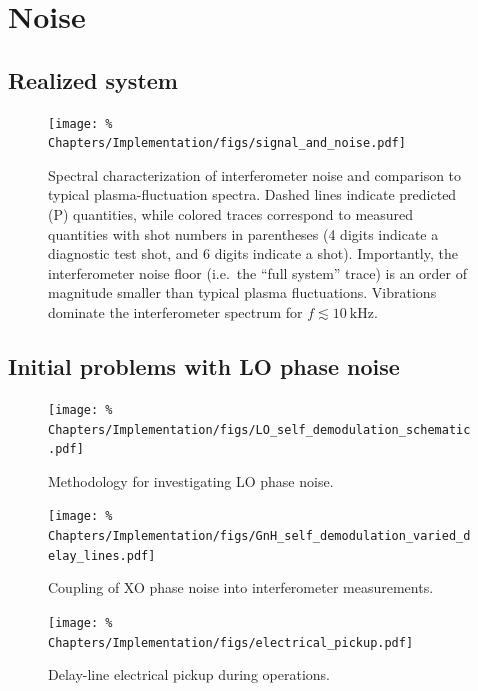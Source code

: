 \section{Noise}


\subsection{Realized system}
\begin{figure}
  \centering
  \texttt{[image: \%
    Chapters/Implementation/figs/signal\_and\_noise.pdf]}
  \caption[Spectral characterization of interferometer noise]{%
    Spectral characterization of interferometer noise and
    comparison to typical plasma-fluctuation spectra.
    Dashed lines indicate predicted (P) quantities, while
    colored traces correspond to measured quantities
    with shot numbers in parentheses
    (4 digits indicate a diagnostic test shot, and
    6 digits indicate a \diiid\space shot).
    Importantly, the interferometer noise floor
    (i.e.\ the ``full system'' trace)
    is an order of magnitude smaller than
    typical plasma fluctuations.
    Vibrations dominate the interferometer spectrum
    for $f \lesssim \SI{10}{\kilo\hertz}$.
  }
\label{fig:Implementation:signal_and_noise}
\end{figure}


\subsection{Initial problems with LO phase noise}
\begin{figure}
  \centering
  \texttt{[image: \%
    Chapters/Implementation/figs/LO\_self\_demodulation\_schematic.pdf]}
  \caption[Methodology for investigating LO phase noise]{%
    Methodology for investigating LO phase noise.
  }
  \label{fig:Implementation:LO_self_demodulation_schematic}
\end{figure}

\begin{figure}
  \centering
  \texttt{[image: \%
    Chapters/Implementation/figs/GnH\_self\_demodulation\_varied\_delay\_lines.pdf]}
  \caption[Coupling of XO phase noise into interferometer measurements]{%
    Coupling of XO phase noise into interferometer measurements.
  }
  \label{fig:Implementation:GnH_self_demodulation}
\end{figure}

\begin{figure}
  \centering
  \texttt{[image: \%
    Chapters/Implementation/figs/electrical\_pickup.pdf]}
  \caption[Delay-line electrical pickup during \diiid\space operations]{%
    Delay-line electrical pickup during \diiid\space operations.
  }
  \label{fig:Implementation:electrical_pickup}
\end{figure}


